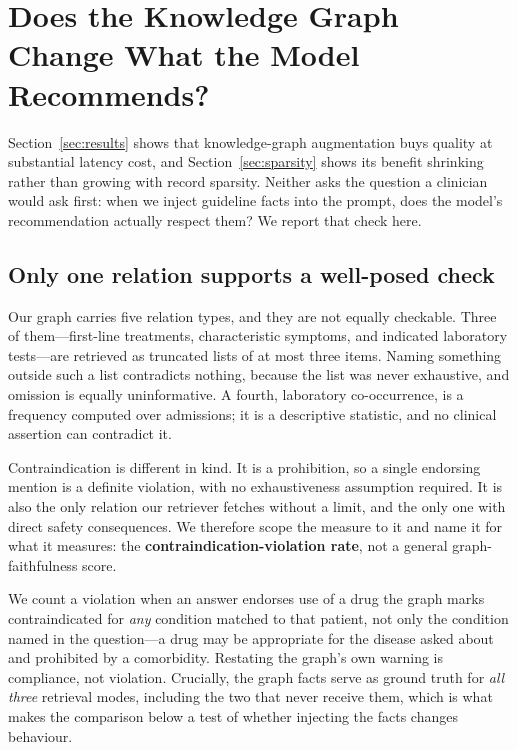 
\section{Does the Knowledge Graph Change What the Model Recommends?}
\label{sec:kg-violation}

Section~\ref{sec:results} shows that knowledge-graph augmentation buys quality
at substantial latency cost, and Section~\ref{sec:sparsity} shows its benefit
shrinking rather than growing with record sparsity. Neither asks the question a
clinician would ask first: when we inject guideline facts into the prompt, does
the model's recommendation actually respect them? We report that check here.

\subsection{Only one relation supports a well-posed check}

Our graph carries five relation types, and they are not equally checkable. Three
of them---first-line treatments, characteristic symptoms, and indicated
laboratory tests---are retrieved as truncated lists of at most three items.
Naming something outside such a list contradicts nothing, because the list was
never exhaustive, and omission is equally uninformative. A fourth,
laboratory co-occurrence, is a frequency computed over admissions; it is a
descriptive statistic, and no clinical assertion can contradict it.

Contraindication is different in kind. It is a prohibition, so a single
endorsing mention is a definite violation, with no exhaustiveness assumption
required. It is also the only relation our retriever fetches without a limit,
and the only one with direct safety consequences. We therefore scope the
measure to it and name it for what it measures: the
\textbf{contraindication-violation rate}, not a general graph-faithfulness
score.

We count a violation when an answer endorses use of a drug the graph marks
contraindicated for \emph{any} condition matched to that patient, not only the
condition named in the question---a drug may be appropriate for the disease
asked about and prohibited by a comorbidity. Restating the graph's own warning
is compliance, not violation. Crucially, the graph facts serve as ground truth
for \emph{all three} retrieval modes, including the two that never receive
them, which is what makes the comparison below a test of whether injecting the
facts changes behaviour.

